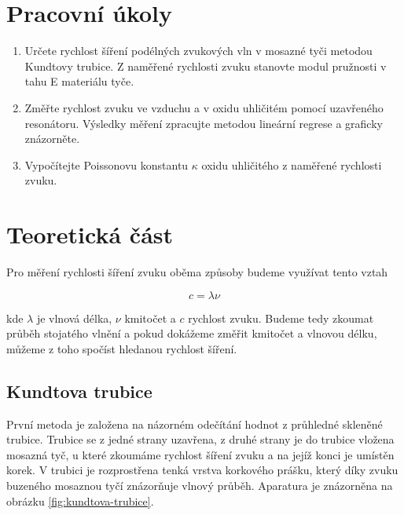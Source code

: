 \section{Pracovní úkoly}

\begin{enumerate}
\item Určete rychlost šíření podélných zvukových vln v mosazné tyči metodou Kundtovy trubice. Z naměřené rychlosti zvuku stanovte modul pružnosti v tahu E materiálu tyče.

\item Změřte rychlost zvuku ve vzduchu a v oxidu uhličitém pomocí uzavřeného resonátoru. Výsledky měření zpracujte metodou lineární regrese a graficky znázorněte.

\item Vypočítejte Poissonovu konstantu \( \kappa \) oxidu uhličitého z naměřené rychlosti zvuku.

\end{enumerate}
\section{Teoretická část}

Pro měření rychlosti šíření zvuku oběma způsoby budeme využívat tento vztah

\begin{equation}
    c = \lambda \nu
\end{equation}

kde \( \lambda \) je vlnová délka, \( \nu \) kmitočet a \(c\) rychlost zvuku. Budeme tedy zkoumat průběh stojatého vlnění a pokud dokážeme změřit kmitočet a vlnovou délku, můžeme z toho spočíst hledanou rychlost šíření.

\subsection{Kundtova trubice}
První metoda je založena na názorném odečítání hodnot z průhledné skleněné trubice. Trubice se z jedné strany uzavřena, z druhé strany je do trubice vložena mosazná tyč, u které zkoumáme rychlost šíření zvuku a na jejíž konci je umístěn korek. V trubici je rozprostřena tenká vrstva korkového prášku, který díky zvuku buzeného mosaznou tyčí znázorňuje vlnový průběh. Aparatura je znázorněna na obrázku \ref{fig:kundtova-trubice}.

